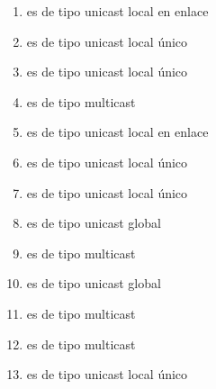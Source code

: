 \documentclass[letterpaper,10pt,spanish]{sphinxmanual}
\begin{document}
\label{\detokenize{t2_integracion_elementos/apuntes_t2:soluciones-a-la-clasificaciones-de-direcciones-ipv6}}\begin{enumerate}
%
\item {} 
\sphinxAtStartPar
{} es de tipo unicast local en enlace

\item {} 
\sphinxAtStartPar
{} es de tipo unicast local único

\item {} 
\sphinxAtStartPar
{} es de tipo unicast local único

\item {} 
\sphinxAtStartPar
{} es de tipo multicast

\item {} 
\sphinxAtStartPar
{} es de tipo unicast local en enlace

\item {} 
\sphinxAtStartPar
{} es de tipo unicast local único

\item {} 
\sphinxAtStartPar
{} es de tipo unicast local único

\item {} 
\sphinxAtStartPar
{} es de tipo unicast global

\item {} 
\sphinxAtStartPar
{} es de tipo multicast

\item {} 
\sphinxAtStartPar
{} es de tipo unicast global

\item {} 
\sphinxAtStartPar
{} es de tipo multicast

\item {} 
\sphinxAtStartPar
{} es de tipo multicast

\item {} 
\sphinxAtStartPar
{} es de tipo unicast local único


\end{enumerate}
\end{document}
